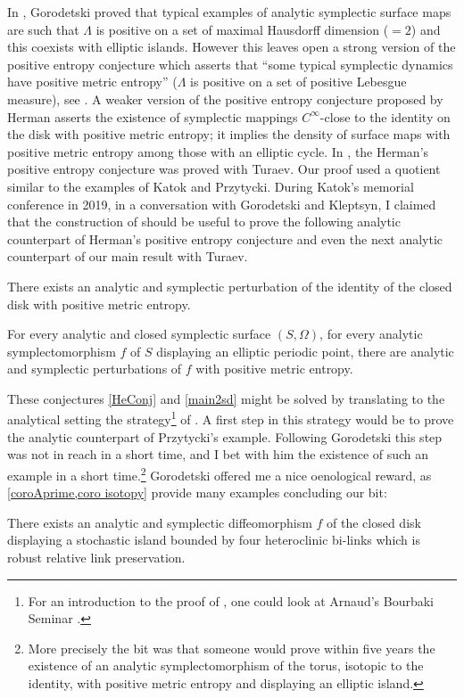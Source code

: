 In \cite{Go12}, Gorodetski proved that typical examples of analytic symplectic surface maps are such that $\Lambda$ is positive on a set of maximal Hausdorff dimension ($= 2$) and this coexists with elliptic islands. However this leaves open a strong version of the positive entropy conjecture which asserts that ``some typical symplectic dynamics have positive metric entropy'' ($\Lambda$ is positive on a set of positive Lebesgue measure), see \eg \cite[p.\,144]{Si94}. A weaker version of the positive entropy conjecture proposed by Herman \cite{He98} asserts the existence of symplectic mappings $C^\infty$-close to the identity on the disk with positive metric entropy; it implies the density of surface maps with positive metric entropy among those with an elliptic cycle. In \cite{BT19}, the Herman's positive entropy conjecture was proved with Turaev. Our proof used a quotient similar to the examples of Katok and Przytycki. During Katok's memorial conference in 2019, in a conversation with Gorodetski and Kleptsyn, I claimed that the construction of \cite{BT19} should be useful to prove the following analytic counterpart of Herman's positive entropy conjecture \cite{He98} and even the next analytic counterpart of our main result with Turaev.

\begin{conjecture}\label{HeConj}
There exists an analytic and symplectic perturbation of the identity of the closed disk with positive metric entropy.
\end{conjecture}

\begin{conjecture}\label{main2sd}
For every analytic and closed symplectic surface $(S,\Omega)$, for every analytic symplectomorphism $f$ of $S$ displaying an elliptic periodic point, there are analytic and symplectic perturbations of $f$ with positive metric entropy.
\end{conjecture}
These conjectures \ref{HeConj} and \ref{main2sd} might be solved by translating to the analytical setting the strategy\footnote{For an introduction to the proof of \cite{BT19}, one could look at Arnaud's Bourbaki Seminar \cite{Ar19}.} of \cite{BT19}. A first step in this strategy would be to prove the analytic counterpart of Przytycki's example. Following Gorodetski this step was not in reach in a short time, and I bet with him the
existence of such an example in a short time.\footnote{More precisely the bit was that someone would prove within five years the existence of an analytic symplectomorphism of the torus, isotopic to the identity, with positive metric entropy and displaying an elliptic island.} Gorodetski offered me a nice oenological reward, as \cref{coroAprime,coro isotopy} provide many examples concluding our bit:
\begin{corollary}\label{coroAprime}
There exists an analytic and symplectic diffeomorphism $f$ of the closed disk displaying a stochastic island bounded by four heteroclinic bi-links which is robust relative link preservation. \end{corollary}

